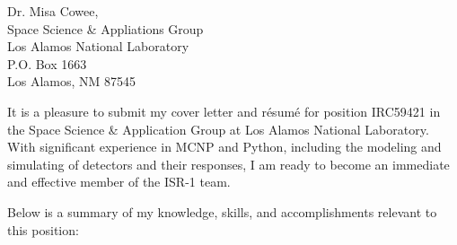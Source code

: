 
\begin{center}
\begin{minipage}{0.95\textwidth}

  \normalsize

  \vspace{4mm} 


  Dr. Misa Cowee, \\

  Space Science \& Appliations Group \\
  Los Alamos National Laboratory \\
  P.O. Box 1663 \\
  Los Alamos, NM 87545 \\
  
  \vspace{4mm} 

  It is a pleasure to submit my cover letter and r\'{e}sum\'{e} for position IRC59421 in the Space Science \& Application Group at Los Alamos National Laboratory.
  With significant experience in \textsc{MCNP} and Python, including the modeling and simulating of detectors and their responses, I am ready to become an immediate and effective member of the ISR-1 team.
  
  \vspace{2mm}
  Below is a summary of my knowledge, skills, and accomplishments relevant to this position: \vspace{1mm}




\end{minipage}
\end{center}
